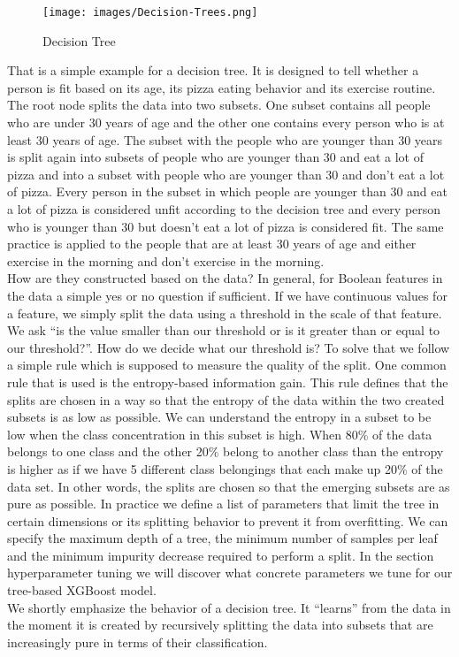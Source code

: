 \documentclass[a4paper,12pt]{report}
\begin{document}
\begin{figure}[htbp]
  \centering
  \texttt{[image: images/Decision-Trees.png]}
  \caption{Decision Tree}
  \label{fig:fullwidth}
\end{figure}
	
	That is a simple example for a decision tree. It is designed to tell whether a person is fit based on its age, its pizza eating behavior and its exercise routine. The root node splits the data into two subsets. One subset contains all people who are under 30 years of age and the other one contains every person who is at least 30 years of age. The subset with the people who are younger than 30 years is split again into subsets of people who are younger than 30 and eat a lot of pizza and into a subset with people who are younger than 30 and don’t eat a lot of pizza. Every person in the subset in which people are younger than 30 and eat a lot of pizza is considered unfit according to the decision tree and every person who is younger than 30 but doesn’t eat a lot of pizza is considered fit. The same practice is applied to the people that are at least 30 years of age and either exercise in the morning and don’t exercise in the morning.\\	
	How are they constructed based on the data? In general, for Boolean features in the data a simple yes or no question if sufficient. If we have continuous values for a feature, we simply split the data using a threshold in the scale of that feature. We ask “is the value smaller than our threshold or is it greater than or equal to our threshold?”. How do we decide what our threshold is? To solve that we follow a simple rule which is supposed to measure the quality of the split. One common rule that is used is the entropy-based information gain. This rule defines that the splits are chosen in a way so that the entropy of the data within the two created subsets is as low as possible. We can understand the entropy in a subset to be low when the class concentration in this subset is high. When 80\% of the data belongs to one class and the other 20\% belong to another class than the entropy is higher as if we have 5 different class belongings that each make up 20\% of the data set. In other words, the splits are chosen so that the emerging subsets are as pure as possible. In practice we define a list of parameters that limit the tree in certain dimensions or its splitting behavior to prevent it from overfitting. We can specify the maximum depth of a tree, the minimum number of samples per leaf and the minimum impurity decrease required to perform a split. In the section hyperparameter tuning we will discover what concrete parameters we tune for our tree-based XGBoost model.\\
	We shortly emphasize the behavior of a decision tree. It “learns” from the data in the moment it is created by recursively splitting the data into subsets that are increasingly pure in terms of their classification. \\
	
\end{document}
